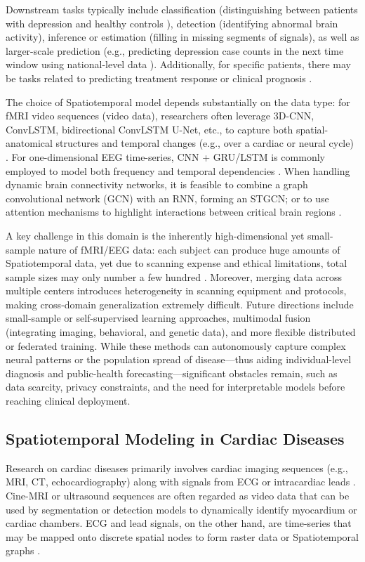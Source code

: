 \documentclass[acmsmall]{acmart}
\begin{document}
Downstream tasks typically include classification (distinguishing between patients with depression and healthy controls \cite{2,5}), detection (identifying abnormal brain activity), inference or estimation (filling in missing segments of signals), as well as larger-scale prediction (e.g., predicting depression case counts in the next time window using national-level data \cite{3}). Additionally, for specific patients, there may be tasks related to predicting treatment response or clinical prognosis \cite{4,5}.

The choice of Spatiotemporal model depends substantially on the data type: for fMRI video sequences (video data), researchers often leverage 3D-CNN, ConvLSTM, bidirectional ConvLSTM U-Net, etc., to capture both spatial-anatomical structures and temporal changes (e.g., over a cardiac or neural cycle) \cite{7,8}. For one-dimensional EEG time-series, CNN + GRU/LSTM is commonly employed to model both frequency and temporal dependencies \cite{2}. When handling dynamic brain connectivity networks, it is feasible to combine a graph convolutional network (GCN) with an RNN, forming an STGCN; or to use attention mechanisms to highlight interactions between critical brain regions \cite{4,5}.

A key challenge in this domain is the inherently high-dimensional yet small-sample nature of fMRI/EEG data: each subject can produce huge amounts of Spatiotemporal data, yet due to scanning expense and ethical limitations, total sample sizes may only number a few hundred \cite{4,5}. Moreover, merging data across multiple centers introduces heterogeneity in scanning equipment and protocols, making cross-domain generalization extremely difficult. Future directions include small-sample or self-supervised learning approaches, multimodal fusion (integrating imaging, behavioral, and genetic data), and more flexible distributed or federated training. While these methods can autonomously capture complex neural patterns or the population spread of disease—thus aiding individual-level diagnosis and public-health forecasting—significant obstacles remain, such as data scarcity, privacy constraints, and the need for interpretable models before reaching clinical deployment.

\subsection{Spatiotemporal Modeling in Cardiac Diseases}
Research on cardiac diseases primarily involves cardiac imaging sequences (e.g., MRI, CT, echocardiography) along with signals from ECG or intracardiac leads \cite{6,7,8}. Cine-MRI or ultrasound sequences are often regarded as video data that can be used by segmentation or detection models to dynamically identify myocardium or cardiac chambers. ECG and lead signals, on the other hand, are time-series that may be mapped onto discrete spatial nodes to form raster data or Spatiotemporal graphs \cite{8}.
\end{document}
